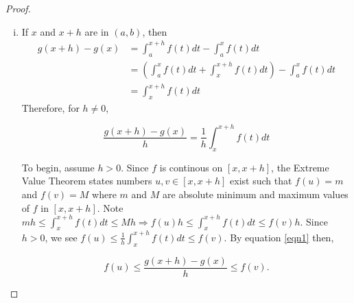 \documentclass[a4paper,8pt]{article}
\begin{document}
\begin{outline}
    \begin{proof}
      \begin{enumerate}[i.]
        \item
          If \(x\) and \(x+h\) are in \((a, b)\), then
          \begin{align*}
            g(x+h)-g(x)&=\int_a^{x+h}f(t)dt-\int_a^xf(t)dt\\
                       &=\left(\int_a^xf(t)dt + \int_x^{x+h}f(t)dt\right)-\int_a^{x}f(t)dt\\
                       &=\int_x^{x+h}f(t)dt
          \end{align*}
          Therefore, for \(h \neq 0\),

          \begin{equation}
            \label{eqn1}
            \frac{g(x+h)-g(x)}{h} = \frac{1}{h}\int_x^{x+h}f(t)dt
          \end{equation}

          To begin, assume \(h > 0\). Since \(f\) is continous on \([x, x+h]\), the Extreme Value Theorem states
          numbers \(u, v\in [x, x+h]\) exist such that \(f(u)=m\) and \(f(v)=M\) where \(m\) and \(M\) are absolute
          minimum and maximum values of \(f\) in \([x, x+h]\). Note \(mh \leq \int_x^{x+h}f(t)dt \leq Mh
          \Rightarrow f(u)h \leq\int_x^{x+h}f(t)dt \leq f(v)h\). Since \(h > 0\), we see \(f(u) \leq
          \frac{1}{h}\int_x^{x+h}f(t)dt \leq f(v)\). By equation \eqref{eqn1} then,

          \begin{equation}
            \label{eqn2}
            f(u) \leq \frac{g(x+h)-g(x)}{h} \leq f(v)\text{.}
          \end{equation}


\end{enumerate}
\end{proof}
\end{outline}
\end{document}
